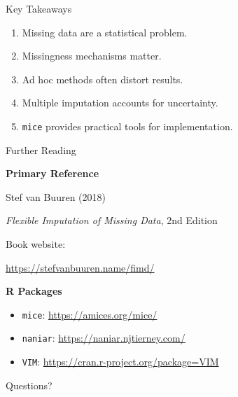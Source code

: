 \documentclass{beamer}
\begin{document}
\begin{frame}{Key Takeaways}

\begin{enumerate}
\item Missing data are a statistical problem.
\item Missingness mechanisms matter.
\item Ad hoc methods often distort results.
\item Multiple imputation accounts for uncertainty.
\item \texttt{mice} provides practical tools for implementation.
\end{enumerate}
\end{frame}



\begin{frame}{Further Reading}

\textbf{Primary Reference}

\vspace{0.5em}

Stef van Buuren (2018)

\emph{Flexible Imputation of Missing Data}, 2nd Edition

\vspace{0.5em}

Book website:

\url{https://stefvanbuuren.name/fimd/}

\vspace{0.5em}

\textbf{R Packages}

\begin{itemize}
\item \texttt{mice}: \url{https://amices.org/mice/}
\item \texttt{naniar}: \url{https://naniar.njtierney.com/}
\item \texttt{VIM}: \url{https://cran.r-project.org/package=VIM}
\end{itemize}

\end{frame}

\begin{frame}
\centering
\Huge Questions?
\end{frame}
\end{document}
